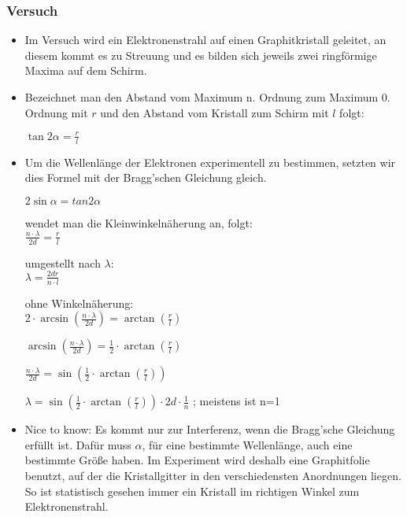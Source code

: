 \subsubsection{Versuch}
\begin{itemize}
\item Im Versuch wird ein Elektronenstrahl auf einen Graphitkristall geleitet, an diesem kommt es zu Streuung und es bilden sich jeweils zwei ringförmige Maxima auf dem Schirm.
\item Bezeichnet man den Abstand vom Maximum n. Ordnung zum Maximum 0. Ordnung mit $r$ und den Abstand vom Kristall zum Schirm mit $l$ folgt:

$\tan{2\alpha} = \frac{r}{l}$
\item Um die Wellenlänge der Elektronen experimentell zu bestimmen, setzten wir dies Formel mit der Bragg'schen Gleichung gleich.

$2\sin{\alpha} = tan{2\alpha}$

wendet man die Kleinwinkelnäherung an, folgt: \\
\Large $\frac{n\cdot\lambda}{2d}=\frac{r}{l}$

\normalsize

umgestellt nach $\lambda$:\\
\Large $\lambda = \frac{2dr}{n\cdot l}$

\normalsize

ohne Winkelnäherung:\\
\Large $2\cdot\arcsin(\frac{n\cdot \lambda}{2d})=\arctan(\frac{r}{l}) $

\Large $\arcsin(\frac{n\cdot \lambda}{2d})=\frac{1}{2}\cdot\arctan(\frac{r}{l})$ 

\Large $\frac{n\cdot \lambda}{2d}=\sin(\frac{1}{2}\cdot\arctan(\frac{r}{l}))$ 

\Large $\lambda=\sin(\frac{1}{2}\cdot\arctan(\frac{r}{l}))\cdot 2d \cdot \frac{1}{n}$  ; meistens ist n=1 

\normalsize

\item Nice to know: Es kommt nur zur Interferenz, wenn die Bragg'sche Gleichung erfüllt ist. Dafür muss $\alpha$, für eine bestimmte Wellenlänge, auch eine bestimmte Größe haben. Im Experiment wird deshalb eine Graphitfolie benutzt, auf der die Kristallgitter in den verschiedensten Anordnungen liegen. So ist statistisch gesehen immer ein Kristall im richtigen Winkel zum Elektronenstrahl.
\end{itemize}

